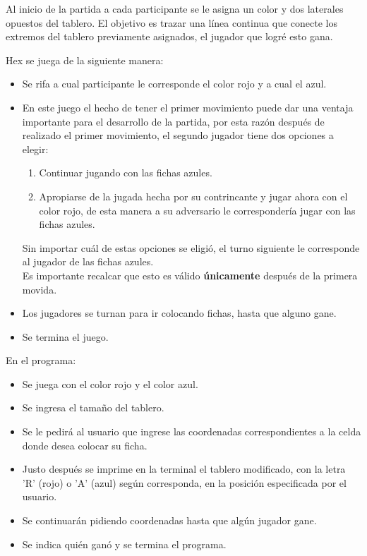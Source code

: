 \documentclass[12pt,letterpaper]{article}
\begin{document}
Al inicio de la partida a cada participante se le asigna un color y dos laterales opuestos del tablero. El objetivo es trazar una línea continua que conecte los extremos del tablero previamente asignados, el jugador que logré esto gana.

\vspace{1 em}

Hex se juega de la siguiente manera:
\begin{itemize}
\item Se rifa a cual participante le corresponde el color rojo y a cual el azul.
\item En este juego el hecho de tener el primer movimiento puede dar una ventaja importante para el desarrollo de la partida, por esta razón después de realizado el primer movimiento, el segundo jugador tiene dos opciones a elegir:
\begin{enumerate}
\item Continuar jugando con las fichas azules.
\item Apropiarse de la jugada hecha por su contrincante y jugar ahora con el color rojo, de esta manera a su adversario le correspondería jugar con las fichas azules.
\end{enumerate}
Sin importar cuál de estas opciones se eligió, el turno siguiente le corresponde al jugador de las fichas azules.\\
Es importante recalcar que esto es válido \textbf{únicamente} después de la primera movida.
\item Los jugadores se turnan para ir colocando fichas, hasta que alguno gane.
\item Se termina el juego.
\end{itemize}

En el programa:
\begin{itemize}
\item Se juega con el color rojo y el color azul.
\item Se ingresa el tamaño del tablero.
\item Se le pedirá al usuario que ingrese las coordenadas correspondientes a la celda donde desea colocar su ficha.
\item Justo después se imprime en la terminal el tablero modificado, con la letra 'R' (rojo) o 'A' (azul) según corresponda, en la posición especificada por el usuario.
\item Se continuarán pidiendo coordenadas hasta que algún jugador gane.
\item Se indica quién ganó y se termina el programa.
\end{itemize}
\end{document}
